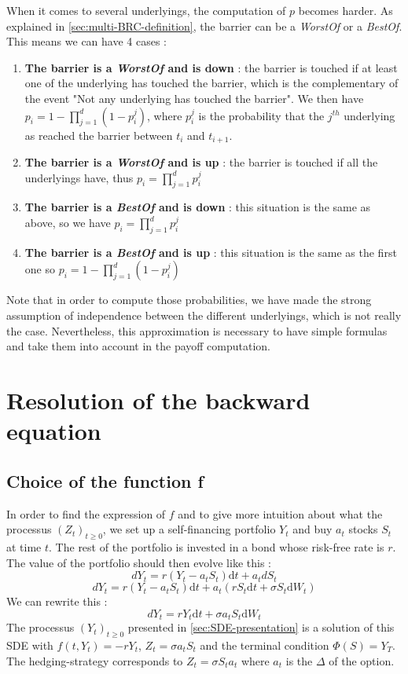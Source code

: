 \documentclass[a4paper,11pt,english]{book}
\begin{document}
When it comes to several underlyings, the computation of $p$ becomes harder. As explained in \ref{sec:multi-BRC-definition}, the barrier can be a \textit{WorstOf} or a \textit{BestOf}. This means we can have 4 cases :
\begin{enumerate}
    \item \textbf{The barrier is a \textit{WorstOf} and is down} : the barrier is touched if at least one of the underlying has touched the barrier, which is the complementary of the event "Not any underlying has touched the barrier". We then have $p_{i}=1-\prod_{j=1}^{d}(1-p_{i}^{j})$, where $p_{i}^{j}$ is the probability that the $j^{th}$ underlying as reached the barrier between $t_{i}$ and $t_{i+1}$.
    
    \item \textbf{The barrier is a \textit{WorstOf} and is up} : the barrier is touched if all the underlyings have, thus $p_{i}=\prod_{j=1}^{d}p_{i}^{j}$
    
    \item \textbf{The barrier is a \textit{BestOf} and is down} : this situation is the same as above, so we have $p_{i}=\prod_{j=1}^{d}p_{i}^{j}$
    
    \item \textbf{The barrier is a \textit{BestOf} and is up} : this situation is the same as the first one so  $p_{i}=1-\prod_{j=1}^{d}(1-p_{i}^{j})$
\end{enumerate}
Note that in order to compute those probabilities, we have made the strong assumption of independence between the different underlyings, which is not really the case. Nevertheless, this approximation is necessary to have simple formulas and take them into account in the payoff computation.
\section{Resolution of the backward equation}
\subsection{Choice of the function f}
\label{subsec:choice-of-f}
In order to find the expression of $f$ and to give more intuition about what the processus $(Z_{t})_{t\geq0}$, we set up a self-financing portfolio $Y_{t}$ and buy $a_{t}$ stocks $S_{t}$ at time $t$. The rest of the portfolio is invested in a bond whose risk-free rate is $r$. The value of the portfolio should then evolve like this :
$$dY_{t} = r(Y_{t}-a_{t}S_{t})\text{d}t + a_{t}dS_{t}$$
$$dY_{t} = r(Y_{t}-a_{t}S_{t})\text{d}t + a_{t}(rS_{t}\text{d}t+\sigma S_{t}\text{d}W_{t})$$
We can rewrite this :
$$dY_{t} = rY_{t}\text{d}t + \sigma a_{t}S_{t}\text{d}W_{t}$$
The processus $(Y_{t})_{t\geq0}$ presented in \ref{sec:SDE-presentation} is a solution of this SDE with $f(t,Y_{t})=-rY_{t}$, $Z_{t} = \sigma a_{t}S_{t}$ and the terminal condition $\Phi(S)=Y_{T}$.
The hedging-strategy corresponds to $Z_{t}=\sigma S_{t} a_{t}$ where $a_{t}$ is the $\Delta$ of the option. 
\end{document}
